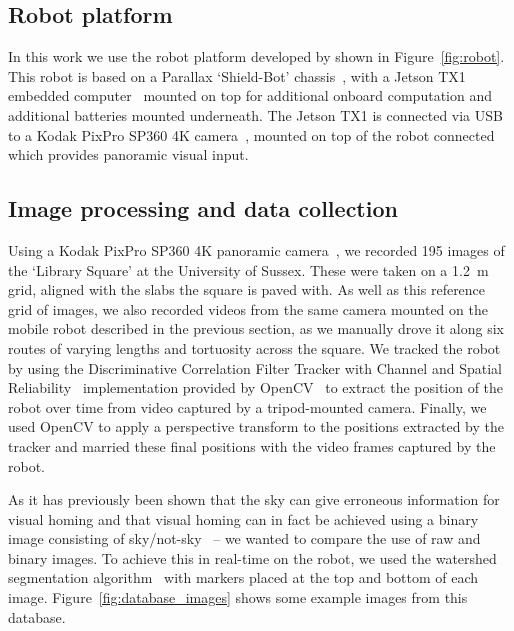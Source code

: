 \documentclass[letterpaper]{article}
\begin{document}
\subsection{Robot platform}
\label{sec:robot_platform}
In this work we use the robot platform developed by \citet{Domcsek2018} shown in Figure~\ref{fig:robot}.
This robot is based on a Parallax `Shield-Bot' chassis~\citep{ParallaxInc}, with a Jetson TX1 embedded computer~\citep{NVIDIACorporation2016} mounted on top for additional onboard computation and additional batteries mounted underneath. 
The Jetson TX1 is connected via USB to a Kodak PixPro SP360 4K camera~\citep{JKImagingLtd}, mounted on top of the robot connected which provides panoramic visual input.

\subsection{Image processing and data collection}
\label{sec:image_database}
Using a Kodak PixPro SP360 4K panoramic camera~\citep{JKImagingLtd}, we recorded \num{195} images of the ‘Library Square’ at the University of Sussex. 
These were taken on a \SI{1.2}{\metre} grid, aligned with the slabs the square is paved with.
As well as this reference grid of images, we also recorded videos from the same camera mounted on the mobile robot described in the previous section, as we manually drove it along six routes of varying lengths and tortuosity across the square. 
We tracked the robot by using the Discriminative Correlation Filter Tracker with Channel and Spatial Reliability~\citep{Lukezic2018} implementation provided by OpenCV~\citep{OpenCV} to extract the position of the robot over time from video captured by a tripod-mounted camera. 
Finally, we used OpenCV to apply a perspective transform to the positions extracted by the tracker and married these final positions with the video frames captured by the robot. 

As it has previously been shown that the sky can give erroneous information for visual homing and that visual homing can in fact be achieved using a binary image consisting of sky/not-sky~\citep{Philippides2011,Stone2014} -- we wanted to compare the use of raw and binary images.
To achieve this in real-time on the robot, we used the watershed segmentation algorithm~\citep{Beucher1979} with markers placed at the top and bottom of each image.
Figure~\ref{fig:database_images} shows some example images from this database.
\end{document}
